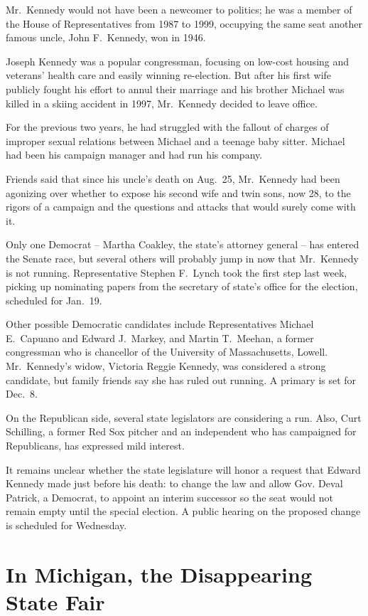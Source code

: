﻿\documentclass[12pt]{article}
\begin{document}
Mr.~Kennedy would not have been a newcomer to politics; he was a member of the House of
Representatives from 1987 to 1999, occupying the same seat another famous uncle, John F.~Kennedy,
won in 1946.

Joseph Kennedy was a popular congressman, focusing on low-cost housing and veterans' health care and
easily winning re-election. But after his first wife publicly fought his effort to annul their
marriage and his brother Michael was killed in a skiing accident in 1997, Mr.~Kennedy decided to
leave office.

For the previous two years, he had struggled with the fallout of charges of improper sexual
relations between Michael and a teenage baby sitter. Michael had been his campaign manager and had
run his company.

Friends said that since his uncle's death on Aug.~25, Mr.~Kennedy had been agonizing over whether to
expose his second wife and twin sons, now 28, to the rigors of a campaign and the questions and
attacks that would surely come with it.

Only one Democrat -- Martha Coakley, the state's attorney general -- has entered the Senate race,
but several others will probably jump in now that Mr.~Kennedy is not running. Representative Stephen
F.~Lynch took the first step last week, picking up nominating papers from the secretary of state's
office for the election, scheduled for Jan.~19.

Other possible Democratic candidates include Representatives Michael E.~Capuano and Edward
J.~Markey, and Martin T.~Meehan, a former congressman who is chancellor of the University of
Massachusetts, Lowell. Mr.~Kennedy's widow, Victoria Reggie Kennedy, was considered a strong
candidate, but family friends say she has ruled out running. A primary is set for Dec.~8.

On the Republican side, several state legislators are considering a run. Also, Curt Schilling, a
former Red Sox pitcher and an independent who has campaigned for Republicans, has expressed mild
interest.

It remains unclear whether the state legislature will honor a request that Edward Kennedy made just
before his death: to change the law and allow Gov. Deval Patrick, a Democrat, to appoint an interim
successor so the seat would not remain empty until the special election. A public hearing on the
proposed change is scheduled for Wednesday.

\section{In Michigan, the Disappearing State Fair}
\end{document}
